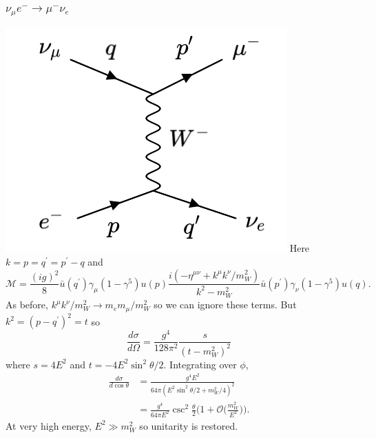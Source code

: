 \documentclass[a4paper,12pt]{article}
\begin{document}
\subsubsection{$\nu_\mu e^- \to \mu^- \nu_e$}
%
  \includegraphics[width=0.3\linewidth]{figs/17c.png}
Here $k = p=q^\prime = p^\prime - q$ and
\begin{equation}
\mathcal{M} = \frac{(ig)^2}{8}\bar{u}(q^\prime)\gamma_\mu(1-\gamma^5)u(p)\frac{i(-\eta^{\mu\nu} + k^\mu k^\nu/m_W^2)}{k^2-m_W^2}\bar{u}(p^\prime)\gamma_\nu (1-\gamma^5)u(q).
\end{equation}
As before, $k^\mu k^\nu /m_W^2 \to m_e m_\mu /m_W^2$ so we can ignore these terms. But $k^2 = (p-q^\prime)^2 = t$ so
\begin{equation}
\frac{d\sigma}{d\Omega} = \frac{g^4}{128\pi^2}\frac{s}{(t-m_W^2)^2}
\end{equation}
where $s=4E^2$ and $t=-4E^2\sin^2\theta/2$. Integrating over $\phi$,
\begin{equation}
\begin{split}
\frac{d\sigma}{d\cos\theta} &= \frac{g^4E^2}{64\pi(E^2\sin^2\theta/2 + m_W^2/4)^2}
\\
&= \frac{g^4}{64\pi E^2}\csc^2 \frac{\theta}{2}\bigg( 1 + \mathcal{O}\big(\frac{m_W^2}{E^2}\big)\bigg).
\end{split}
\end{equation}
At very high energy, $E^2 \gg m_W^2$ so unitarity is restored. 
%
\end{document}
